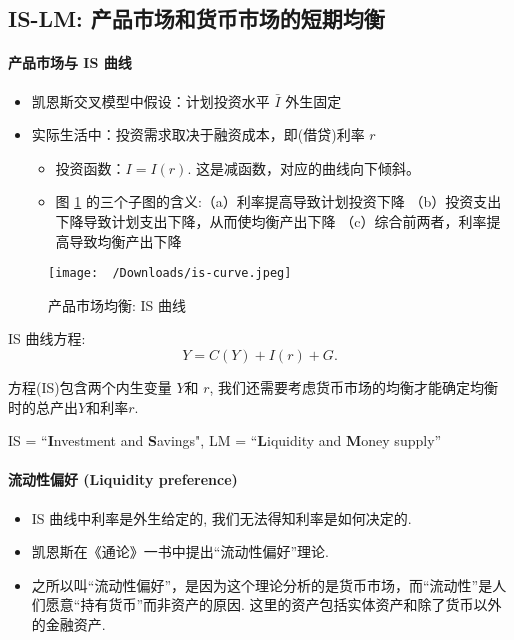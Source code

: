 \documentclass[11pt]{ctexart}
\author{}
\date{}
\begin{document}
\begin{center}
  \subsection*{IS-LM: 产品市场和货币市场的短期均衡}
\end{center}

\paragraph{产品市场与 IS 曲线}
\begin{itemize}
\item
  凯恩斯交叉模型中假设：计划投资水平 $\bar{I}$ 外生固定
\item
  实际生活中：投资需求取决于融资成本，即(借贷)利率 $r$

  \begin{itemize}
  \item
    投资函数：$I = I(r)$. 这是减函数，对应的曲线向下倾斜。
  \item
    图 \ref{fig:is} 的三个子图的含义:（a）利率提高导致计划投资下降
    （b）投资支出下降导致计划支出下降，从而使均衡产出下降
    （c）综合前两者，利率提高导致均衡产出下降
  \end{itemize}
\end{itemize}

\begin{figure}[htbp]
\centering
\texttt{[image: ~/Downloads/is-curve.jpeg]}
\caption{产品市场均衡: IS 曲线}
\label{fig:is}
\end{figure}

IS 曲线方程: 
\begin{equation*}
Y = C(Y) + I(r) + G. 
\tag{IS}  
\end{equation*}

方程(IS)包含两个内生变量 $Y$和 $r$, 我们还需要考虑货币市场的均衡才能确定均衡时的总产出$Y$和利率$r$.

IS = ``\textbf{I}nvestment and \textbf{S}avings", LM = ``\textbf{L}iquidity and \textbf{M}oney supply''

\paragraph{流动性偏好 (Liquidity preference)}
\begin{itemize}
\item
  IS 曲线中利率是外生给定的, 我们无法得知利率是如何决定的.
\item
  凯恩斯在《通论》一书中提出``流动性偏好''理论.
\item
  之所以叫``流动性偏好''，是因为这个理论分析的是货币市场，而``流动性''是人们愿意``持有货币''而非资产的原因. 这里的资产包括实体资产和除了货币以外的金融资产.
\end{itemize}
\end{document}
